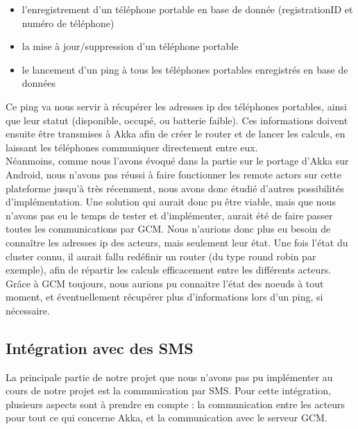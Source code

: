 \documentclass[a4paper,12pt]{article}
\begin{document}
\begin{itemize}
\item l’enregistrement d’un téléphone portable en base de donnée
  (registrationID et numéro de téléphone)\\
\item la mise à jour/suppression d’un téléphone portable\\
\item le lancement d’un ping à tous les téléphones portables enregistrés en
  base de données
\end{itemize}

Ce ping va nous servir à récupérer les adresses ip des téléphones portables,
ainsi que leur statut (disponible, occupé, ou batterie faible). Ces
informations doivent ensuite être transmises à Akka afin de créer le router et
de lancer les calculs, en laissant les téléphones communiquer directement entre
eux.\\


Néanmoins, comme nous l’avons évoqué dans la partie sur le portage
d’Akka sur Android, nous n’avons pas réussi à faire fonctionner les remote
actors sur cette plateforme jusqu’à très récemment, nous avons donc étudié
d’autres possibilités d’implémentation.  Une solution qui aurait donc pu être
viable, mais que nous n’avons pas eu le temps de tester et d’implémenter,
aurait été de faire passer toutes les communications par GCM. Nous n’aurions
donc plus eu besoin de connaître les adresses ip des acteurs, mais seulement
leur état. Une fois l’état du cluster connu, il aurait fallu redéfinir un
router (du type round robin par exemple), afin de répartir les calculs
efficacement entre les différents acteurs. Grâce à GCM toujours, nous aurions
pu connaitre l’état des noeuds à tout moment, et éventuellement récupérer plus
d’informations lors d’un ping, si nécessaire.

\subsection{Intégration avec des SMS}
La principale partie de notre projet que nous n’avons pas pu implémenter au
cours de notre projet est la communication par SMS.  Pour cette intégration,
plusieurs aspects sont à prendre en compte : la communication entre les acteurs
pour tout ce qui concerne Akka, et la communication avec le serveur GCM.\\
\end{document}
